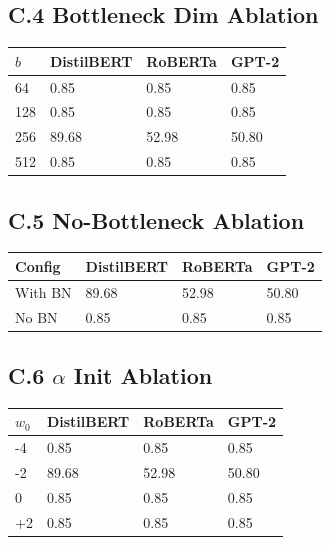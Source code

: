 \subsection{C.4 Bottleneck Dim Ablation}

\begin{table}[H]
\centering
\small
\begin{tabular}{llll}
\toprule
\textbf{$b$} & \textbf{DistilBERT} & \textbf{RoBERTa} & \textbf{GPT-2} \\
\midrule
64 & 0.85 & 0.85 & 0.85 \\
128 & 0.85 & 0.85 & 0.85 \\
256 & 89.68 & 52.98 & 50.80 \\
512 & 0.85 & 0.85 & 0.85 \\
\bottomrule
\end{tabular}
\end{table}

\subsection{C.5 No-Bottleneck Ablation}

\begin{table}[H]
\centering
\small
\begin{tabular}{llll}
\toprule
\textbf{Config} & \textbf{DistilBERT} & \textbf{RoBERTa} & \textbf{GPT-2} \\
\midrule
With BN & 89.68 & 52.98 & 50.80 \\
No BN & 0.85 & 0.85 & 0.85 \\
\bottomrule
\end{tabular}
\end{table}

\subsection{C.6 $\alpha$ Init Ablation}

\begin{table}[H]
\centering
\small
\begin{tabular}{llll}
\toprule
\textbf{$w_0$} & \textbf{DistilBERT} & \textbf{RoBERTa} & \textbf{GPT-2} \\
\midrule
-4 & 0.85 & 0.85 & 0.85 \\
-2 & 89.68 & 52.98 & 50.80 \\
0 & 0.85 & 0.85 & 0.85 \\
+2 & 0.85 & 0.85 & 0.85 \\
\bottomrule
\end{tabular}
\end{table}

